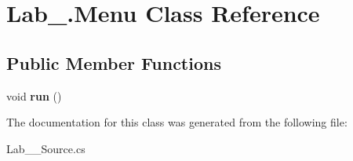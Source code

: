\hypertarget{class_lab__3_1_1_menu}{}\section{Lab\+\_.\+Menu Class Reference}
\label{class_lab__3_1_1_menu}
\subsection*{Public Member Functions}
\begin{DoxyCompactItemize}
\item 
\mbox{\label{class_lab__3_1_1_menu_a99dafd028d14bc0ec37ebf4a59c66f76}} 
void {\bfseries run} ()
\end{DoxyCompactItemize}


The documentation for this class was generated from the following file\+:\begin{DoxyCompactItemize}
\item 
Lab\+\_\+\_\+\+Source.\+cs\end{DoxyCompactItemize}
